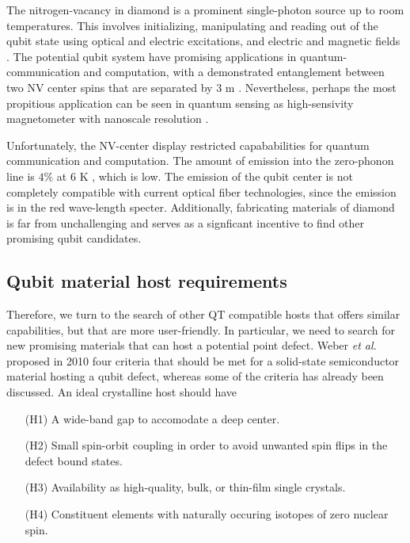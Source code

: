 \clearpage

\clearpage

The nitrogen-vacancy in diamond is a prominent single-photon source up to room temperatures. This involves initializing, manipulating and reading out of the qubit state using optical and electric excitations, and electric and magnetic fields \cite{Gordon2013}. The potential qubit system have promising applications in quantum- communication and computation, with a demonstrated entanglement between two NV center spins that are separated by $3$ m \cite{Bernien2013}. Nevertheless, perhaps the most propitious application can be seen in quantum sensing as high-sensivity magnetometer with nanoscale resolution \cite{Taylor2008}.

Unfortunately, the NV-center display restricted capababilities for quantum communication and computation. The amount of emission into the zero-phonon line is $4 \%$ at $6$ K \cite{Barclay2011}, which is low. The emission of the qubit center is not completely compatible with current optical fiber technologies, since the emission is in the red wave-length specter. Additionally, fabricating materials of diamond is far from unchallenging and serves as a signficant incentive to find other promising qubit candidates.

\subsection{Qubit material host requirements}

Therefore, we turn to the search of other QT compatible hosts that offers similar capabilities, but that are more user-friendly. In particular, we need to search for new promising materials that can host a potential point defect. Weber \textit{et al.} \cite{Weber2010} proposed in 2010 four criteria that should be met for a solid-state semiconductor material hosting a qubit defect, whereas some of the criteria has already been discussed. An ideal crystalline host should have \cite{Weber2010}
\begin{itemize}
  \item[(H1)] A wide-band gap to accomodate a deep center.
  \item[(H2)] Small spin-orbit coupling in order to avoid unwanted spin flips in the defect bound states.
  \item[(H3)] Availability as high-quality, bulk, or thin-film single crystals.
  \item[(H4)] Constituent elements with naturally occuring isotopes of zero nuclear spin.
\end{itemize}

